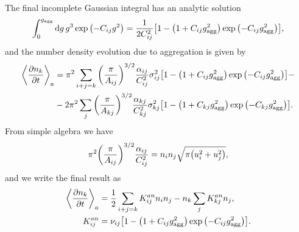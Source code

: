 \documentclass[aps,prl,preprint,groupedaddress,10pt]{revtex4-2}
\begin{document}
The final incomplete Gaussian integral has an analytic solution
\begin{equation}
    \int_{0}^{\ltx{g}{agg}}\dd{g}g^3\exp\pqty{-C_{ij}g^2}=
    \frac{1}{2C_{ij}^2}\bqty{1-\pqty{1+C_{ij}\ltx{g}{agg}^2}\exp\pqty{-C_{ij}\ltx{g}{agg}^2}},
\end{equation}
and the number density evolution due to aggregation is given by
\begin{equation}
    \begin{split}
        \avg{\pdv{n_k}{t}}_a&=\pi^2\sum_{i+j=k}\pqty{\frac{\pi}{A_{ij}}}^{3/2}
        \frac{\alpha_{ij}}{C_{ij}^2}\sigma_{ij}^2
        \bqty{1-\pqty{1+C_{ij}\ltx{g}{agg}^2}\exp\pqty{-C_{ij}\ltx{g}{agg}^2}}-\\
        &-2\pi^2\sum_{j}\pqty{\frac{\pi}{A_{kj}}}^{3/2}\frac{\alpha_{kj}}{C_{kj}^2}\sigma_{kj}^2
        \bqty{1-\pqty{1+C_{kj}\ltx{g}{agg}^2}\exp\pqty{-C_{kj}\ltx{g}{agg}^2}}.
    \end{split}
\end{equation}
From simple algebra we have
\begin{equation}
    \pi^2\pqty{\frac{\pi}{A_{ij}}}^{3/2}\frac{\alpha_{ij}}{C_{ij}^2}=n_in_j\sqrt{\pi\pqty{u_i^2+u_j^2}},
\end{equation}
and we write the final result as
\begin{equation}
    \begin{split}
        \avg{\pdv{n_k}{t}}_a&=\frac{1}{2}\sum_{i+j=k}K_{ij}^{an}n_in_j-n_k\sum_{j}K_{kj}^{an}n_j,\\
        K_{ij}^{an}&=\nu_{ij}\bqty{1-\pqty{1+C_{ij}\ltx{g}{agg}^2}\exp\pqty{-C_{ij}\ltx{g}{agg}^2}}.
    \end{split}
\end{equation}
\end{document}
